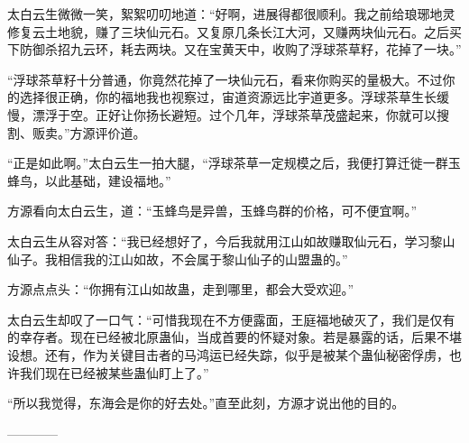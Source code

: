 \begin{this_body}
太白云生微微一笑，絮絮叨叨地道：“好啊，进展得都很顺利。我之前给琅琊地灵修复云土地貌，赚了三块仙元石。又复原几条长江大河，又赚两块仙元石。之后买下防御杀招九云环，耗去两块。又在宝黄天中，收购了浮球茶草籽，花掉了一块。”

“浮球茶草籽十分普通，你竟然花掉了一块仙元石，看来你购买的量极大。不过你的选择很正确，你的福地我也视察过，宙道资源远比宇道更多。浮球茶草生长缓慢，漂浮于空。正好让你扬长避短。过个几年，浮球茶草茂盛起来，你就可以搜割、贩卖。”方源评价道。

“正是如此啊。”太白云生一拍大腿，“浮球茶草一定规模之后，我便打算迁徙一群玉蜂鸟，以此基础，建设福地。”

方源看向太白云生，道：“玉蜂鸟是异兽，玉蜂鸟群的价格，可不便宜啊。”

太白云生从容对答：“我已经想好了，今后我就用江山如故赚取仙元石，学习黎山仙子。我相信我的江山如故，不会属于黎山仙子的山盟蛊的。”

方源点点头：“你拥有江山如故蛊，走到哪里，都会大受欢迎。”

太白云生却叹了一口气：“可惜我现在不方便露面，王庭福地破灭了，我们是仅有的幸存者。现在已经被北原蛊仙，当成首要的怀疑对象。若是暴露的话，后果不堪设想。还有，作为关键目击者的马鸿运已经失踪，似乎是被某个蛊仙秘密俘虏，也许我们现在已经被某些蛊仙盯上了。”

“所以我觉得，东海会是你的好去处。”直至此刻，方源才说出他的目的。

------------

\end{this_body}

